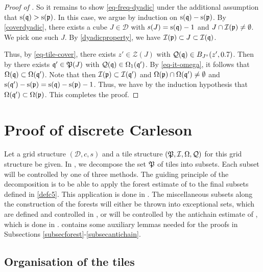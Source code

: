 \begin{proof}[Proof of ]
    So it remains to show \eqref{eq-freq-dyadic} under the additional assumption that ${\mathrm{s}}({\mathfrak q}) > {\mathrm{s}}({\mathfrak p})$. In this case, we argue by induction on ${\mathrm{s}}({\mathfrak q})-{\mathrm{s}}({\mathfrak p})$. By \eqref{coverdyadic}, there exists a cube $J \in \mathcal{D}$ with $s(J) = {\mathrm{s}}({\mathfrak q}) - 1$ and $J \cap{\mathcal{I}}({\mathfrak p}) \ne \emptyset$. We pick one such $J$. By \eqref{dyadicproperty}, we have ${\mathcal{I}}({\mathfrak p}) \subset J \subset {\mathcal{I}}({\mathfrak q})$.

    Thus, by \eqref{eq-tile-cover}, there exists $z' \in \mathcal{Z}(J)$ with ${\mathcal{Q}}({\mathfrak q}) \in B_{J^\circ}(z', 0.7)$. Then by  there exists ${\mathfrak q}' \in {\mathfrak P}(J)$ with ${\mathcal{Q}}({\mathfrak q}) \in\Omega_1({\mathfrak q}')$.
    By \eqref{eq-it-omega}, it follows that $\Omega({\mathfrak q}) \subset \Omega({\mathfrak q}')$. Note that then ${\mathcal{I}}({\mathfrak p}) \subset {\mathcal{I}}({\mathfrak q}')$ and ${\Omega}({\mathfrak p}) \cap {\Omega}({\mathfrak q}') \ne \emptyset$ and ${\mathrm{s}}({\mathfrak q}') - {\mathrm{s}}({\mathfrak p}) = {\mathrm{s}}({\mathfrak q}) - {\mathrm{s}}({\mathfrak p}) - 1$. Thus, we have by the induction hypothesis that $\Omega({\mathfrak q}') \subset \Omega({\mathfrak p})$. This completes the proof.
\end{proof}

\chapter{Proof of discrete Carleson}
\label{proptopropprop}



Let a grid structure $(\mathcal{D}, c, s)$ and a tile structure $({\mathfrak P}, {\mathcal{I}}, {\Omega}, {\mathcal{Q}})$ for this grid structure be given. In , we decompose the set ${\mathfrak P}$ of tiles into subsets. Each subset will be controlled by one of three methods. The guiding principle of the decomposition is to be able to apply the forest estimate of  to the final subsets defined in \eqref{defc5}. This application is done in . The miscellaneous subsets along the construction of the forests will either be thrown into exceptional sets, which are defined and controlled in , or will be controlled by the antichain estimate of , which is done in .  contains some auxiliary lemmas needed for the proofs in Subsections \ref{subsecforest}-\ref{subsecantichain}.

\section{Organisation of the tiles}\label{subsectilesorg}

